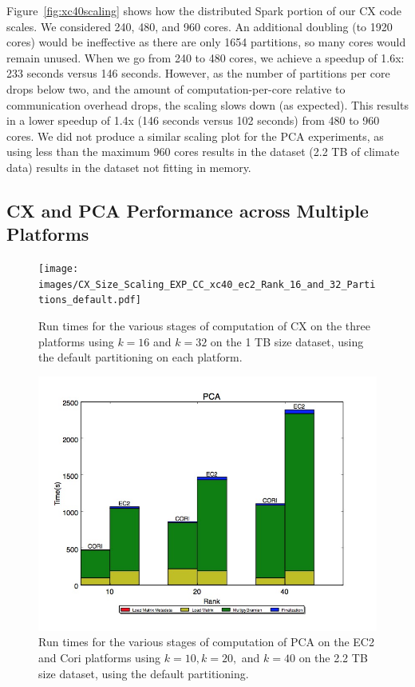 Figure~\ref{fig:xc40scaling} shows how the distributed Spark portion of our CX code scales.
We considered 240, 480, and 960 cores.  An additional doubling (to 1920 cores) would be ineffective as there are only 1654 partitions, 
so many cores would remain unused.  
When we go from 240 to 480 cores, we achieve a speedup of 1.6x:
233 seconds versus 146 seconds.  However, as the number of partitions per core drops 
below two, and the amount of computation-per-core relative to communication overhead drops, 
the scaling slows down (as expected).  
This results in a lower speedup of 1.4x (146 seconds versus 102
seconds) from 480 to 960 cores.
We did not produce a similar scaling plot for the PCA experiments, as using less
than the maximum 960 cores results in the dataset (2.2 TB of climate data)
results in the dataset not fitting in memory.

\subsection{CX and PCA Performance across Multiple Platforms}
  \label{sect:h2h}
    
    \begin{figure} [h!btp]
    \begin{centering}
      \texttt{[image: images/CX\_Size\_Scaling\_EXP\_CC\_xc40\_ec2\_Rank\_16\_and\_32\_Partitions\_default.pdf]}
    \end{centering}
    \caption{ Run times for the various stages of computation of CX on the three platforms using $k=16$ and $k=32$ on the 1 TB size dataset, using the default partitioning on each platform.} 
    \label{fig:h2hrank16} 
    \end{figure}

    \begin{figure} [h!btp]
      \begin{centering}
        \includegraphics[scale=0.3]{images/phase_stackplot_ec2}
      \end{centering}
      \caption{Run times for the various stages of computation of PCA on the EC2 and Cori platforms using $k=10, k=20,$ and $k=40$ on the 2.2 TB size dataset, using the default partitioning.}
      \label{fig:pca_h2hranks}
    \end{figure}
    

